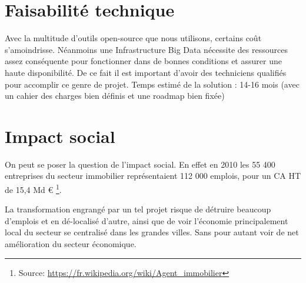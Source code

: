 \documentclass[12pt]{report}
\begin{document}
\section{Faisabilité technique}
Avec la multitude d'outils open-source que nous utilisons, certains coût s'amoindrisse. Néanmoins une Infrastructure
Big Data nécessite des ressources assez conséquente pour fonctionner dans de bonnes conditions et assurer une haute
disponibilité. De ce fait il est important d'avoir des techniciens qualifiés pour accomplir ce genre de projet.
Temps estimé de la solution : 14-16 mois (avec un cahier des charges bien définis et une roadmap bien fixée)


\section{Impact social}
On peut se poser la question de l'impact social.
En effet en 2010 les 55 400 entreprises du secteur immobilier représentaient
112 000 emplois, pour un CA HT de 15,4 Md \euro{}
\footnote{Source: \url{https://fr.wikipedia.org/wiki/Agent_immobilier}}.

La transformation engrangé par un tel projet risque de détruire beaucoup
d'emplois et en dé-localisé d'autre, ainsi que de voir l'économie principalement
local du secteur se centralisé dans les grandes villes. Sans pour autant voir de
net amélioration du secteur économique. 
\end{document}
